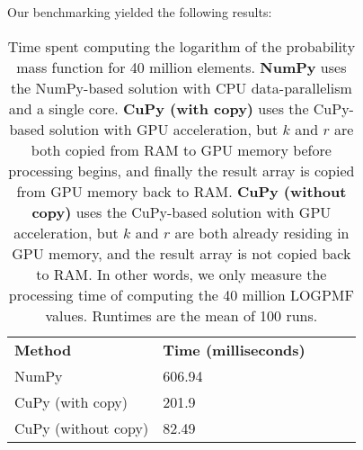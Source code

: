 Our benchmarking yielded the following results:
\begin{table}[H]
\begin{center}
\begin{tabular}{lllll}
\multicolumn{1}{l|}{\textbf{Method}} & \multicolumn{1}{l}{\textbf{Time (milliseconds)}} &  \\ \cline{1-2}
\multicolumn{1}{l|}{NumPy} & \multicolumn{1}{l}{606.94} &  \\
\multicolumn{1}{l|}{CuPy (with copy)} & \multicolumn{1}{l}{201.9} & \\
\multicolumn{1}{l|}{CuPy (without copy)} & \multicolumn{1}{l}{82.49}
\end{tabular}
\end{center}
\caption{
  Time spent computing the logarithm of the probability mass function for 40 million elements.
  \textbf{NumPy} uses the NumPy-based solution with CPU data-parallelism and a single core.
  \textbf{CuPy (with copy)} uses the CuPy-based solution with GPU acceleration, but $k$ and $r$ are both copied from RAM to GPU memory before processing begins, and finally the result array is copied from GPU memory back to RAM.
  \textbf{CuPy (without copy)} uses the CuPy-based solution with GPU acceleration, but $k$ and $r$ are both already residing in GPU memory, and the result array is not copied back to RAM. In other words, we only measure the processing time of computing the 40 million LOGPMF values.
  Runtimes are the mean of 100 runs.
}
\label{methods:gpu_accelerating_genotyping:tables:logpmf_benchmark}
\end{table}

